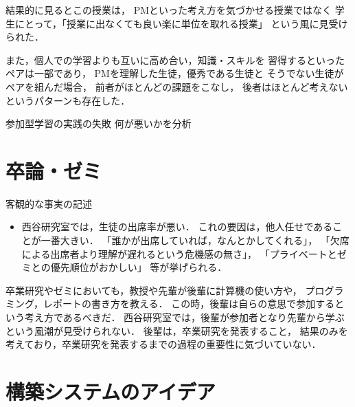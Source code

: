 \documentclass{jsarticle}
\begin{document}
結果的に見るとこの授業は，
PMといった考え方を気づかせる授業ではなく
学生にとって，「授業に出なくても良い楽に単位を取れる授業」
という風に見受けられた．

また，個人での学習よりも互いに高め合い，知識・スキルを
習得するといったペアは一部であり，
PMを理解した生徒，優秀である生徒と
そうでない生徒がペアを組んだ場合，
前者がほとんどの課題をこなし，
後者はほとんど考えないというパターンも存在した．

参加型学習の実践の失敗
何が悪いかを分析


\section{卒論・ゼミ}
\label{sec:orgb9d2384}

客観的な事実の記述
\begin{itemize}
\item 西谷研究室では，生徒の出席率が悪い．
これの要因は，他人任せであることが一番大きい．
「誰かが出席していれば，なんとかしてくれる」，
「欠席による出席者より理解が遅れるという危機感の無さ」，
「プライベートとゼミとの優先順位がおかしい」
等が挙げられる．
\end{itemize}



卒業研究やゼミにおいても，教授や先輩が後輩に計算機の使い方や，
プログラミング，レポートの書き方を教える．
この時，後輩は自らの意思で参加するという考え方であるべきだ．
西谷研究室では，後輩が参加者となり先輩から学ぶという風潮が見受けられない．
後輩は，卒業研究を発表すること，
結果のみを考えており，卒業研究を発表するまでの過程の重要性に気づいていない．

\section{構築システムのアイデア}
\label{sec:org76f24a4}
\end{document}
